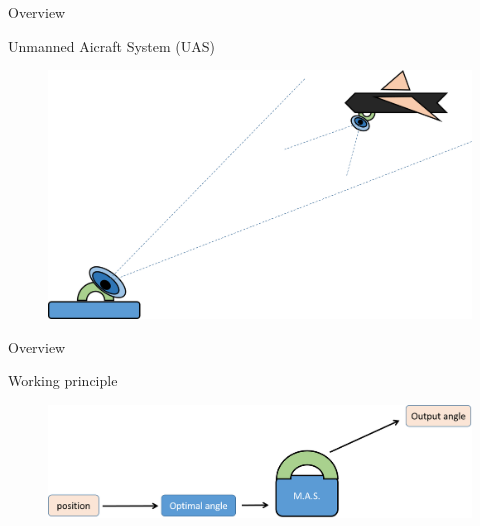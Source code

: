 
\begin{frame}{Overview}{}
  \begin{block}{Unmanned Aicraft System (UAS)}
    
   \begin{figure}[H]
\centerline{
\includegraphics[scale=0.35]{figures/overview.png}}
\label{fig:overview}
\end{figure}

    
  \end{block}
\end{frame}


\begin{frame}{Overview}{}
  \begin{block}{Working principle}
    
   \begin{figure}[H]
\centerline{
\includegraphics[scale=0.35]{figures/overview2.png}}
\label{fig:overview2}
\end{figure}

    
  \end{block}
\end{frame}


